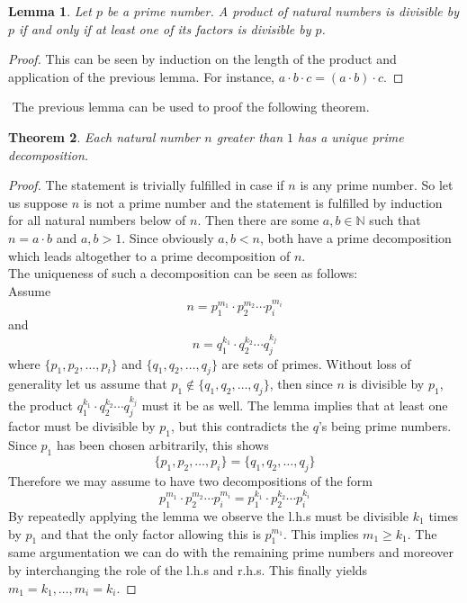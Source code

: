 \documentclass[17pt]{extarticle}
\newtheorem{theorem}{Theorem}
\newtheorem{lemma}[theorem]{Lemma}
\begin{document}
\pagebreak
\begin{lemma}
	Let $p$ be a prime number. A product of natural numbers is divisible by $p$ if and only if
	at least one of its factors is divisible by $p$.
\end{lemma}
\begin{proof}
	This can be seen by induction on the length of the product and application of the previous lemma.
	For instance, $a\cdot b\cdot c=(a\cdot b)\cdot c$.
\end{proof}
$ $\newline
The previous lemma can be used to proof the following theorem.	
\begin{theorem} \label{prime_decomposition}
	Each natural number $n$ greater than $1$ has a unique prime decomposition.
\end{theorem}
\begin{proof}
	The statement is trivially fulfilled in case if $n$ is any prime number. So let us suppose $n$ is
	not a prime number and the statement is fulfilled by induction for all natural numbers below of $n$.
	Then there are some $a, b\in \mathbb{N}$ such that $n=a\cdot b$ and $a,b>1$. Since obviously $a,b<n$, both have a prime decomposition which leads altogether to a prime decomposition of $n$.\\
	The uniqueness of such a decomposition can be seen as follows:\\
	Assume
	$$n=p_1^{m_1}\cdot p_2^{m_2}\cdots p_i^{m_i}$$
	and
	$$n=q_1^{k_1}\cdot q_2^{k_2}\cdots q_j^{k_j}$$
	where $\{p_1, p_2, \dots, p_i\}$ and $\{q_1, q_2, \dots, q_j\}$ are sets of primes.
	Without loss of generality let us assume that $p_1\notin \{q_1, q_2, \dots, q_j\}$, then
	since $n$ is divisible by $p_1$, the product $q_1^{k_1}\cdot q_2^{k_2}\cdots q_j^{k_j}$ must it be
	as well. The lemma implies that at least one factor must be divisible by $p_1$, but this contradicts
	the $q$'s being prime numbers. Since $p_1$ has been chosen arbitrarily, this shows 
	$$\{p_1, p_2, \dots, p_i\}=\{q_1, q_2, \dots, q_j\}$$
	Therefore we may assume to have two decompositions of the form
	$$p_1^{m_1}\cdot p_2^{m_2}\cdots p_i^{m_i}=p_1^{k_1}\cdot p_2^{k_2}\cdots p_i^{k_i}$$
	By repeatedly applying the lemma we observe the l.h.s must be divisible $k_1$ times by $p_1$
	and that the only factor allowing this is $p_1^{m_1}$. This implies $m_1\geq k_1$. The same argumentation we can do with the remaining prime numbers and moreover by interchanging the role of the l.h.s and r.h.s. This finally yields $m_1=k_1, \dots, m_i=k_i$.
\end{proof}
\end{document}
